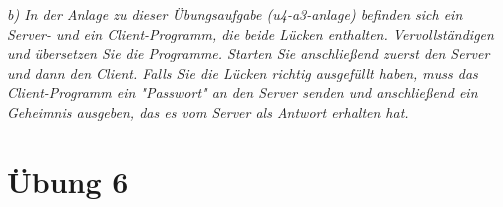 \documentclass[a4paper]{article}
\begin{document}
\textit{b) In der Anlage zu dieser Übungsaufgabe (u4-a3-anlage) befinden sich ein Server- und ein Client-Programm, die beide Lücken enthalten. Vervollständigen und übersetzen Sie die Programme. Starten Sie anschließend zuerst den Server und dann den Client. Falls Sie die Lücken richtig ausgefüllt haben, muss das Client-Programm ein "Passwort" an den Server senden und anschließend ein Geheimnis ausgeben, das es vom Server als Antwort erhalten hat.}
\vspace{10mm}


\newpage
\section{Übung 6}
\end{document}
